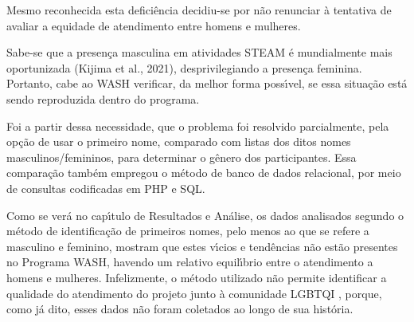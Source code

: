 \documentclass[
12pt,		%
openright,	%
twoside,  %
a4paper,			%
chapter=TITLE,		%
english,			%
french,				%
spanish,			%
brazil				%
]{USPSC-classe/USPSC}
\begin{document}
Mesmo reconhecida esta defici\^encia decidiu-se por n\~ao renunciar \`a tentativa de avaliar a equidade de atendimento entre homens e mulheres.

















Sabe-se que a presen\c{c}a masculina em atividades STEAM \'e mundialmente mais oportunizada  (Kijima et al., 2021),  desprivilegiando a presen\c{c}a feminina. Portanto, cabe ao WASH verificar, da melhor forma poss\'{\i}vel, se essa situa\c{c}\~ao est\'a sendo reproduzida dentro do programa.

















Foi a partir dessa necessidade, que o problema foi resolvido parcialmente, pela op\c{c}\~ao de usar o primeiro nome, comparado com listas dos ditos nomes masculinos/femininos, para determinar o g\^enero dos participantes. Essa compara\c{c}\~ao tamb\'em empregou o m\'etodo de banco de dados relacional, por meio de consultas codificadas em PHP e SQL.

















Como se ver\'a no cap\'{\i}tulo de Resultados e An\'alise, os dados analisados segundo o m\'etodo de identifica\c{c}\~ao de primeiros nomes, pelo menos ao que se refere a masculino e feminino, mostram que estes v\'{\i}cios e tend\^encias n\~ao est\~ao presentes no Programa WASH, havendo um relativo equil\'{\i}brio entre o atendimento a homens e mulheres. Infelizmente, o m\'etodo utilizado n\~ao permite identificar a qualidade do atendimento do projeto junto \`a comunidade LGBTQI , porque, como j\'a dito, esses dados n\~ao foram coletados ao longo de sua hist\'oria.
\end{document}
